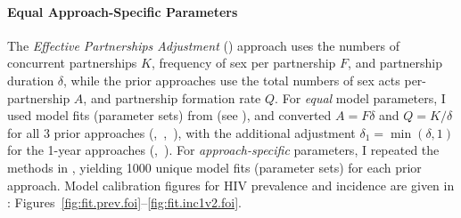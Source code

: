 \paragraph{Equal \vs Approach-Specific Parameters}
The \emph{Effective Partnerships Adjustment} (\epa) approach uses the
numbers of concurrent partnerships $K$,
frequency of sex per partnership $F$,
and partnership duration $\delta$,
while the prior approaches use the
total numbers of sex acts per-partnership $A$,
and partnership formation rate $Q$.
For \emph{equal} model parameters,
I used model fits (parameter sets) from \epa (see ),
and converted $A = F \delta$ and $Q = K/\delta$ for all 3 prior approaches (\ird,~\iry,~\ipy),
with the additional adjustment $\delta_1 = \min{(\delta,1)}$ for the 1-year approaches (\iry,~\ipy).
For \emph{approach-specific} parameters, I repeated the methods in ,
yielding 1000 unique model fits (parameter sets) for each prior approach.
Model calibration figures for HIV prevalence and incidence are given in :
Figures~\ref{fig:fit.prev.foi}--\ref{fig:fit.inc1v2.foi}.
